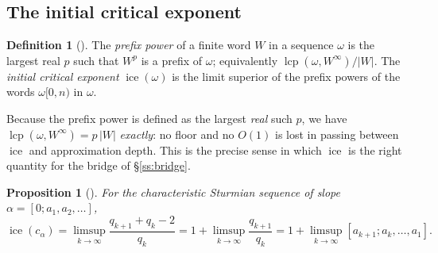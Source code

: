 \documentclass[11pt,reqno]{amsart}
\theoremstyle{plain}
\newtheorem{proposition}[theorem]{Proposition}
\theoremstyle{definition}
\newtheorem{definition}[theorem]{Definition}
\DeclareMathOperator{\lcp}{lcp}
\DeclareMathOperator{\ice}{ice}
\begin{document}
\subsection{The initial critical exponent}
\begin{definition}[{\cite[\S2]{BHZ06}}]\label{def:ice}
The \emph{prefix power} of a finite word $W$ in a sequence $\omega$ is the largest real $p$ such
that $W^{p}$ is a prefix of $\omega$; equivalently $\lcp(\omega,W^{\infty})/|W|$. The
\emph{initial critical exponent} $\ice(\omega)$ is the limit superior of the prefix powers of the
words $\omega[0,n)$ in $\omega$.
\end{definition}

Because the prefix power is defined as the largest \emph{real} such $p$, we have
$\lcp(\omega,W^{\infty})=p\,|W|$ \emph{exactly}: no floor and no $O(1)$ is lost in passing between
$\ice$ and approximation depth. This is the precise sense in which $\ice$ is the right quantity for
the bridge of \S\ref{ss:bridge}.

\begin{proposition}[{\cite[\S4.2]{BHZ06}}]\label{prop:icefla}
For the characteristic Sturmian sequence of slope $\alpha=[0;a_1,a_2,\dots]$,
\[
  \ice(c_\alpha)=\limsup_{k\to\infty}\frac{q_{k+1}+q_k-2}{q_k}
  =1+\limsup_{k\to\infty}\frac{q_{k+1}}{q_k}
  =1+\limsup_{k\to\infty}[a_{k+1};a_k,\dots,a_1].
\]
\end{proposition}
\end{document}
